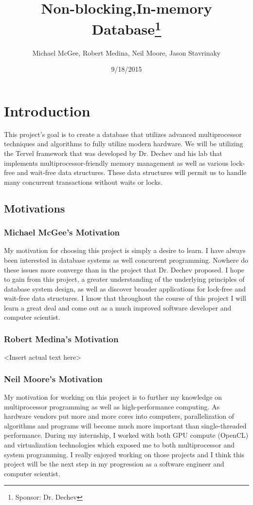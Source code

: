 \documentclass[letterpaper]{article}
\title{Non-blocking,In-memory Database\thanks{Sponsor: Dr. Dechev}}
\author{Michael McGee, Robert Medina, Neil Moore, Jason Stavrinaky}
\date{9/18/2015}
\begin{document}
  \maketitle
  \newpage

  \section{Introduction}
  This project's goal is to create a database that utilizes advanced multiprocessor techniques and algorithms to fully utilize modern hardware.
  We will be utilizing the Tervel framework that was developed by Dr. Dechev and his lab that implements multiprocessor-friendly memory management
  as well as various lock-free and wait-free data structures. These data structures will permit us to handle many concurrent transactions without 
  waits or locks.
  
  \subsection{Motivations}
  \subsubsection{Michael McGee's Motivation}
  My motivation for choosing this project is simply a desire to learn. I have always been interested in database systems as well concurrent programming. Nowhere do these issues more converge than in the project that Dr. Dechev proposed.  
  I hope to gain from this project, a greater understanding of the underlying principles of database system design, as well as discover broader applications for lock-free and wait-free data structures. I know that throughout the course of this project I will learn a great deal and come out as a much improved software developer and computer scientist.  
  \subsubsection{Robert Medina's Motivation}
  \textless Insert actual text here\textgreater
  \subsubsection{Neil Moore's Motivation}
  My motivation for working on this project is to further my knowledge on multiprocessor programming as well as high-performance computing.  
  As hardware vendors put more and more cores into computers, parallelization of algorithms and programs will become much more important than
  single-threaded performance. During my internship, I worked with both GPU compute (OpenCL) and virtualization technologies which exposed me
  to both multiprocessor and system programming. I really enjoyed working on those projects and I think this project will be the next step 
  in my progression as a software engineer and computer scientist.
\end{document}
